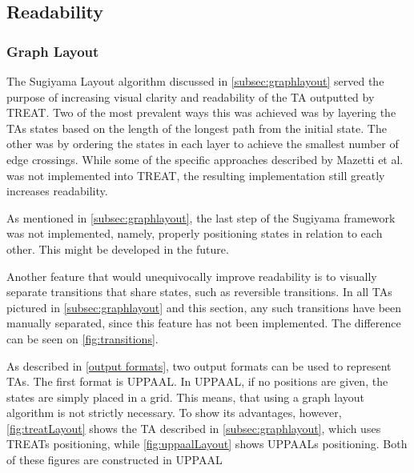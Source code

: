 \subsection{Readability}

\subsubsection{Graph Layout}
The Sugiyama Layout algorithm discussed in \cref{subsec:graphlayout} served the purpose of increasing visual clarity and readability of the TA outputted by TREAT.
Two of the most prevalent ways this was achieved was by layering the TAs states based on the length of the longest path from the initial state. The other was by ordering the states in each layer to achieve the smallest number of edge crossings.
While some of the specific approaches described by Mazetti et al. \cite{Mazetti2012} was not implemented into TREAT, the resulting implementation still greatly increases readability.

As mentioned in \cref{subsec:graphlayout}, the last step of the Sugiyama framework was not implemented, namely, properly positioning states in relation to each other. This might be developed in the future.

Another feature that would unequivocally improve readability is to visually separate transitions that share states, such as reversible transitions.
In all TAs pictured in \cref{subsec:graphlayout} and this section, any such transitions have been manually separated, since this feature has not been implemented. The difference can be seen on \cref{fig:transitions}.

\begin{center}
    
\end{center}

As described in \cref{output formats}, two output formats can be used to represent TAs.
The first format is UPPAAL. In UPPAAL, if no positions are given, the states are simply placed in a grid. This means, that using a graph layout algorithm is not strictly necessary.
To show its advantages, however, \cref{fig:treatLayout} shows the TA described in \cref{subsec:graphlayout}, which uses TREATs positioning, while \cref{fig:uppaalLayout} shows UPPAALs positioning. Both of these figures are constructed in UPPAAL

